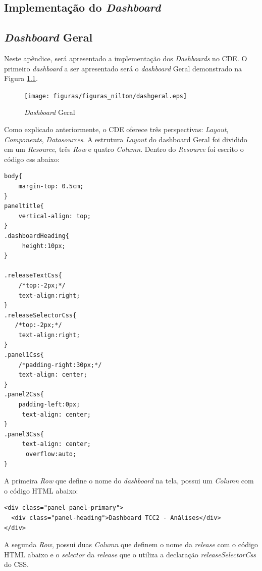 \begin{apendicesenv}
\chapter{Implementação do \textit{Dashboard}}
\label{sec:implementação-dashboard}

\section{\textit{Dashboard} Geral}

Neste apêndice, será apresentado a implementação dos \textit{Dashboards} no CDE. O primeiro \textit{dashboard} a ser apresentado será o \textit{dashboard} Geral demonstrado na Figura \ref{fig:dashgeral}.

\begin{figure}[h!]
\centering
\texttt{[image: figuras/figuras\_nilton/dashgeral.eps]}
\caption{\textit{Dashboard} Geral}
\label{fig:dashgeral}
\end{figure}
\FloatBarrier

Como explicado anteriormente, o CDE oferece três perspectivas: \textit{Layout}, \textit{Components}, \textit{Datasources}. A estrutura  \textit{Layout} do {dashboard} Geral foi dividido em um \textit{Resource}, três \textit{Row} e quatro \textit{Column}. Dentro do \textit{Resource} foi escrito o código css abaixo:

\begin{verbatim}
body{
    margin-top: 0.5cm;
} 
paneltitle{
    vertical-align: top; 
}
.dashboardHeading{
     height:10px;
}

.releaseTextCss{
    /*top:-2px;*/  
    text-align:right;
} 
.releaseSelectorCss{
   /*top:-2px;*/  
    text-align:right;
}
.panel1Css{
    /*padding-right:30px;*/
    text-align: center;  
}
.panel2Css{
    padding-left:0px;
     text-align: center;  
}
.panel3Css{
     text-align: center;  
      overflow:auto; 
}

\end{verbatim}

A primeira \textit{Row} que define o nome do \textit{dashboard} na tela, possui um \textit{Column} com o código HTML abaixo:

\begin{verbatim}
<div class="panel panel-primary">
  <div class="panel-heading">Dashboard TCC2 - Análises</div>
</div> 
\end{verbatim} 


A segunda \textit{Row}, possui duas \textit{Column} que definem o nome da \textit{release} com o código HTML abaixo e o \textit{selector} da \textit{release} que o utiliza a declaração \textit{releaseSelectorCss} do CSS.


\end{apendicesenv}
